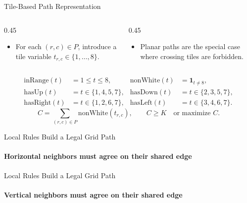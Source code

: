 \documentclass[aspectratio=169,10pt]{beamer}
\begin{document}
\begin{frame}{Tile-Based Path Representation}
  \centering
  \resizebox{0.9\linewidth}{!}{%
  }
  \vspace{1em}

  \begin{columns}[T,totalwidth=0.96\textwidth]
    \begin{column}{0.45\textwidth}
      \begin{itemize}
        \item For each \((r,c)\in P\), introduce a tile variable
          \(t_{r,c}\in\{1,\ldots,8\}\).
      \end{itemize}
    \end{column}
    \begin{column}{0.45\textwidth}
      \begin{itemize}
        \item Planar paths are the special case where crossing tiles are forbidden.
      \end{itemize}
    \end{column}
  \end{columns}
  \vspace{0.25em}
  \[
    \begin{aligned}
      \mathrm{inRange}(t)&=1\le t\le 8,
      &
      \mathrm{nonWhite}(t)&=\mathbf{1}_{t\ne 8},
      \\
      \mathrm{hasUp}(t)&=t\in\{1,4,5,7\},
      &
      \mathrm{hasDown}(t)&=t\in\{2,3,5,7\},
      \\
      \mathrm{hasRight}(t)&=t\in\{1,2,6,7\},
      &
      \mathrm{hasLeft}(t)&=t\in\{3,4,6,7\}.
    \end{aligned}
  \]
  \vspace{0.05em}
  \[
    C=\sum_{(r,c)\in P}\mathrm{nonWhite}(t_{r,c}),
    \qquad
    C\ge K \quad\text{or maximize } C.
  \]
\end{frame}

\begin{frame}{Local Rules Build a Legal Grid Path}
  \framesubtitle{Horizontal neighbors must agree on their shared edge}
  \centering
  
\end{frame}

\begin{frame}{Local Rules Build a Legal Grid Path}
  \framesubtitle{Vertical neighbors must agree on their shared edge}
  \centering
  
\end{frame}
\end{document}
